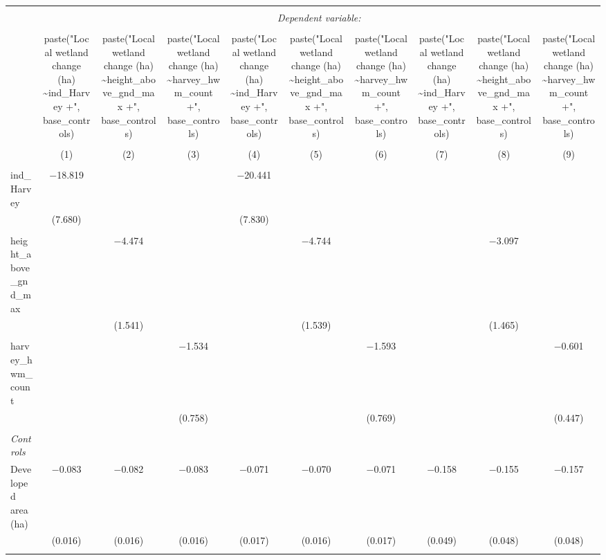 \begin{tabular}{@{\extracolsep{5pt}}lccccccccc} 
\\[-1.8ex]\hline 
\hline \\[-1.8ex] 
 & \multicolumn{9}{c}{\textit{Dependent variable:}} \\ 
\cline{2-10} 
\\[-1.8ex] & paste("Local wetland change (ha) \textasciitilde ind\_Harvey +", base\_controls) & paste("Local wetland change (ha) \textasciitilde height\_above\_gnd\_max +", base\_controls) & paste("Local wetland change (ha) \textasciitilde harvey\_hwm\_count +", base\_controls) & paste("Local wetland change (ha) \textasciitilde ind\_Harvey +", base\_controls) & paste("Local wetland change (ha) \textasciitilde height\_above\_gnd\_max +", base\_controls) & paste("Local wetland change (ha) \textasciitilde harvey\_hwm\_count +", base\_controls) & paste("Local wetland change (ha) \textasciitilde ind\_Harvey +", base\_controls) & paste("Local wetland change (ha) \textasciitilde height\_above\_gnd\_max +", base\_controls) & paste("Local wetland change (ha) \textasciitilde harvey\_hwm\_count +", base\_controls) \\ 
\\[-1.8ex] & (1) & (2) & (3) & (4) & (5) & (6) & (7) & (8) & (9)\\ 
\hline \\[-1.8ex] 
 ind\_Harvey & $-$18.819 &  &  & $-$20.441 &  &  &  &  &  \\ 
  & (7.680) &  &  & (7.830) &  &  &  &  &  \\ 
  & & & & & & & & & \\ 
 height\_above\_gnd\_max &  & $-$4.474 &  &  & $-$4.744 &  &  & $-$3.097 &  \\ 
  &  & (1.541) &  &  & (1.539) &  &  & (1.465) &  \\ 
  & & & & & & & & & \\ 
 harvey\_hwm\_count &  &  & $-$1.534 &  &  & $-$1.593 &  &  & $-$0.601 \\ 
  &  &  & (0.758) &  &  & (0.769) &  &  & (0.447) \\ 
  & & & & & & & & & \\ 
 \emph{Controls} \\ Developed area (ha) & $-$0.083 & $-$0.082 & $-$0.083 & $-$0.071 & $-$0.070 & $-$0.071 & $-$0.158 & $-$0.155 & $-$0.157 \\ 
  & (0.016) & (0.016) & (0.016) & (0.017) & (0.016) & (0.017) & (0.049) & (0.048) & (0.048) \\ 
  & & & & & & & & & \\ 

\end{tabular}
